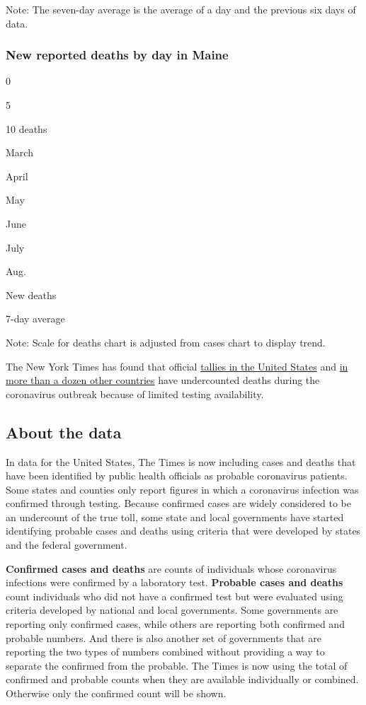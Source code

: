 Note: The seven-day average is the average of a day and the previous six
days of data.

\hypertarget{new-reported-deaths-by-day-in-maine}{%
\subsubsection{New reported deaths by day in
Maine}\label{new-reported-deaths-by-day-in-maine}}

0

5

10 deaths

March

April

May

June

July

Aug.

New deaths

7-day average

Note: Scale for deaths chart is adjusted from cases chart to display
trend.

The New York Times has found that official
\href{https://www.nytimes3xbfgragh.onion/interactive/2020/04/28/us/coronavirus-death-toll-total.html}{tallies
in the United States} and
\href{https://www.nytimes3xbfgragh.onion/interactive/2020/04/21/world/coronavirus-missing-deaths.html}{in
more than a dozen other countries} have undercounted deaths during the
coronavirus outbreak because of limited testing availability.

\hypertarget{about-the-data}{%
\subsection{About the data}\label{about-the-data}}

In data for the United States, The Times is now including cases and
deaths that have been identified by public health officials as probable
coronavirus patients. Some states and counties only report figures in
which a coronavirus infection was confirmed through testing. Because
confirmed cases are widely considered to be an undercount of the true
toll, some state and local governments have started identifying probable
cases and deaths using criteria that were developed by states and the
federal government.

\textbf{Confirmed cases and deaths} are counts of individuals whose
coronavirus infections were confirmed by a laboratory test.
\textbf{Probable cases and deaths} count individuals who did not have a
confirmed test but were evaluated using criteria developed by national
and local governments. Some governments are reporting only confirmed
cases, while others are reporting both confirmed and probable numbers.
And there is also another set of governments that are reporting the two
types of numbers combined without providing a way to separate the
confirmed from the probable. The Times is now using the total of
confirmed and probable counts when they are available individually or
combined. Otherwise only the confirmed count will be shown.

